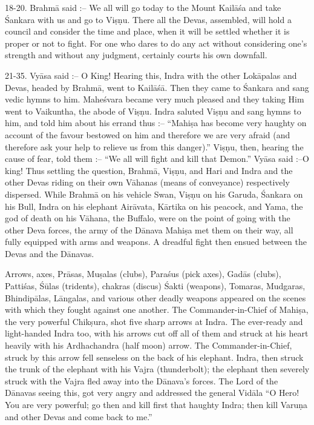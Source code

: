 18-20. Brahm\=a said :-- We all will go today to the Mount Kail\=a\'sa and take \'Sankara with us and go to Vi\d{s}\d{n}u. There all the Devas, assembled, will hold a council and consider the time and place, when it will be settled whether it is proper or not to fight. For one who dares to do any act without considering one's strength and without any judgment, certainly courts his own downfall.

21-35. Vy\=asa said :-- O King! Hearing this, Indra with the other Lok\=apalas and Devas, headed by Brahm\=a, went to Kail\=a\'s\=a. Then they came to \'Sankara and sang vedic hymns to him. Mahe\'svara became very much pleased and they taking Him went to Vaikuntha, the abode of Vi\d{s}\d{n}u. Indra saluted Vi\d{s}\d{n}u and sang hymns to him, and told him about his errand thus :-- ``Mahi\d{s}a has become very haughty on account of the favour bestowed on him and therefore we are very afraid (and therefore ask your help to relieve us from this danger).'' Vi\d{s}\d{n}u, then, hearing the cause of fear, told them :-- ``We all will fight and kill that Demon.'' Vy\=asa said :--O king! Thus settling the question, Brahm\=a, Vi\d{s}\d{n}u, and Hari and Indra and the other Devas riding on their own V\=ahanas (means of conveyance) respectively dispersed. While Brahm\=a on his vehicle Swan, Vi\d{s}\d{n}u on his Garuda, \'Sankara on his Bull, Indra on his elephant Air\=avata, K\=artika on his peacock, and Yama, the god of death on his V\=ahana, the Buffalo, were on the point of going with the other Deva forces, the army of the D\=anava Mahi\d{s}a met them on their way, all fully equipped with arms and weapons. A dreadful fight then ensued between the Devas and the D\=anavas.

Arrows, axes, Pr\=asas, Mu\d{s}alas (clubs), Para\'sus (pick axes), Gad\=as (clubs), Patti\'sas, \'S\=ulas (tridents), chakras (discus) \'Sakti (weapons), Tomaras, Mudgaras, Bhindip\=alas, L\=angalas, and various other deadly weapons appeared on the scenes with which they fought against one another. The Commander-in-Chief of Mahi\d{s}a, the very powerful Chik\d{s}ura, shot five sharp arrows at Indra. The ever-ready and light-handed Indra too, with his arrows cut off all of them and struck at his heart heavily with his Ardhachandra (half moon) arrow. The Commander-in-Chief, struck by this arrow fell senseless on the back of his elephant. Indra, then struck the trunk of the elephant with his Vajra (thunderbolt); the elephant then severely struck with the Vajra fled away into the D\=anava's forces. The Lord of the D\=anavas seeing this, got very angry and addressed the general Vid\=ala ``O Hero! You are very powerful; go then and kill first that haughty Indra; then kill Varu\d{n}a and other Devas and come back to me.''

